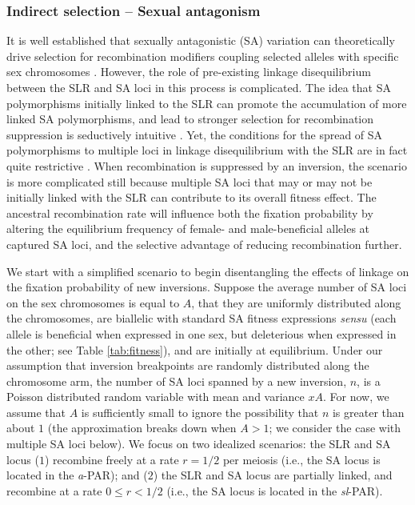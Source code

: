 \documentclass[11pt]{article}
\begin{document}
\subsubsection*{Indirect selection -- Sexual antagonism}\label{sec:SexAntag}

It is well established that sexually antagonistic (SA) variation can theoretically drive selection for recombination modifiers coupling selected alleles with specific sex chromosomes \cite[e.g.][]{Fisher1931,Nei1969, Charlesworth1978a, Charlesworth1980, Bull1983,Lenormand2003, Otto2019}. However, the role of pre-existing linkage disequilibrium between the SLR and SA loci in this process is complicated. The idea that SA polymorphisms initially linked to the SLR can promote the accumulation of more linked SA polymorphisms, and lead to stronger selection for recombination suppression is seductively intuitive \citep{Rice1984, Rice1996, Charlesworth2017, Otto2019}. Yet, the conditions for the spread of SA polymorphisms to multiple loci in linkage disequilibrium with the SLR are in fact quite restrictive \citep{Otto2019}. When recombination is suppressed by an inversion, the scenario is more complicated still because multiple SA loci that may or may not be initially linked with the SLR can contribute to its overall fitness effect. The ancestral recombination rate will influence both the fixation probability by altering the equilibrium frequency of female- and male-beneficial alleles at captured SA loci, and the selective advantage of reducing recombination further.

We start with a simplified scenario to begin disentangling the effects of linkage on the fixation probability of new inversions. Suppose the average number of SA loci on the sex chromosomes is equal to $A$, that they are uniformly distributed along the chromosomes, are biallelic with standard SA fitness expressions {\itshape sensu} \citet{Kidwell1977} (each allele is beneficial when expressed in one sex, but deleterious when expressed in the other; see Table \ref{tab:fitness}), and are initially at equilibrium. Under our assumption that inversion breakpoints are randomly distributed along the chromosome arm, the number of SA loci spanned by a new inversion, $n$, is a Poisson distributed random variable with mean and variance $xA$. For now, we assume that $A$ is sufficiently small to ignore the possibility that $n$ is greater than about $1$ (the approximation breaks down when $A > 1$; we consider the case with multiple SA loci below). We focus on two idealized scenarios: the SLR and SA locus ($1$) recombine freely at a rate $r = 1/2$ per meiosis (i.e., the SA locus is located in the {\itshape a}-PAR); and ($2$) the SLR and SA locus are partially linked, and recombine at a rate $0 \leq r < 1/2$ (i.e., the SA locus is located in the {\itshape sl}-PAR). 
\end{document}

